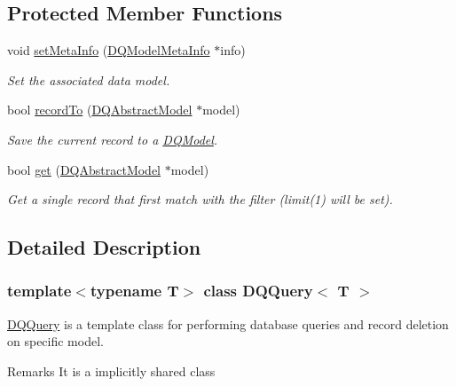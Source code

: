 \subsection*{Protected Member Functions}
\begin{DoxyCompactItemize}
\item 
\hypertarget{classDQSharedQuery_a18f2c23017b66343dbbfd0ffc3a171e7}{
void \hyperlink{classDQSharedQuery_a18f2c23017b66343dbbfd0ffc3a171e7}{setMetaInfo} (\hyperlink{classDQModelMetaInfo}{DQModelMetaInfo} $\ast$info)}
\label{classDQSharedQuery_a18f2c23017b66343dbbfd0ffc3a171e7}

\begin{DoxyCompactList}\small\item\em Set the associated data model. \item\end{DoxyCompactList}\item 
\hypertarget{classDQSharedQuery_a14865995b6d86072f3f69c8770d53d0b}{
bool \hyperlink{classDQSharedQuery_a14865995b6d86072f3f69c8770d53d0b}{recordTo} (\hyperlink{classDQAbstractModel}{DQAbstractModel} $\ast$model)}
\label{classDQSharedQuery_a14865995b6d86072f3f69c8770d53d0b}

\begin{DoxyCompactList}\small\item\em Save the current record to a \hyperlink{classDQModel}{DQModel}. \item\end{DoxyCompactList}\item 
bool \hyperlink{classDQSharedQuery_a62635ab0fa890f085fe2e02bd5d2064e}{get} (\hyperlink{classDQAbstractModel}{DQAbstractModel} $\ast$model)
\begin{DoxyCompactList}\small\item\em Get a single record that first match with the filter (limit(1) will be set). \item\end{DoxyCompactList}\end{DoxyCompactItemize}


\subsection{Detailed Description}
\subsubsection*{template$<$typename T$>$ class DQQuery$<$ T $>$}

\hyperlink{classDQQuery}{DQQuery} is a template class for performing database queries and record deletion on specific model. \begin{DoxyRemark}{Remarks}
It is a implicitly shared class 
\end{DoxyRemark}


